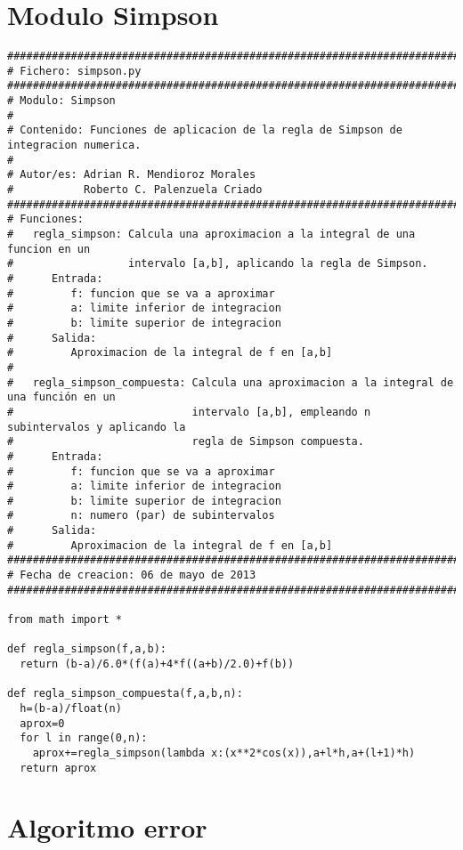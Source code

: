 \section{Modulo Simpson}
\label{Apendice1:Simpson}

\begin{center}
\begin{footnotesize}
\begin{verbatim}
##################################################################################
# Fichero: simpson.py
###################################################################################
# Modulo: Simpson 
#
# Contenido: Funciones de aplicacion de la regla de Simpson de integracion numerica. 
#
# Autor/es: Adrian R. Mendioroz Morales
#           Roberto C. Palenzuela Criado
###################################################################################
# Funciones:
#   regla_simpson: Calcula una aproximacion a la integral de una funcion en un 
#                  intervalo [a,b], aplicando la regla de Simpson.
#      Entrada:
#         f: funcion que se va a aproximar
#         a: limite inferior de integracion
#         b: limite superior de integracion
#      Salida:
#         Aproximacion de la integral de f en [a,b]
# 
#   regla_simpson_compuesta: Calcula una aproximacion a la integral de una función en un 
#                            intervalo [a,b], empleando n subintervalos y aplicando la 
#                            regla de Simpson compuesta.
#      Entrada:
#         f: funcion que se va a aproximar
#         a: limite inferior de integracion
#         b: limite superior de integracion
#         n: numero (par) de subintervalos
#      Salida:
#         Aproximacion de la integral de f en [a,b]
###################################################################################
# Fecha de creacion: 06 de mayo de 2013
###################################################################################

from math import *

def regla_simpson(f,a,b):
  return (b-a)/6.0*(f(a)+4*f((a+b)/2.0)+f(b))
  
def regla_simpson_compuesta(f,a,b,n):
  h=(b-a)/float(n)
  aprox=0
  for l in range(0,n):
    aprox+=regla_simpson(lambda x:(x**2*cos(x)),a+l*h,a+(l+1)*h)
  return aprox
\end{verbatim}
\end{footnotesize}
\end{center}

\section{Algoritmo error}
\label{Apendice1:error}

